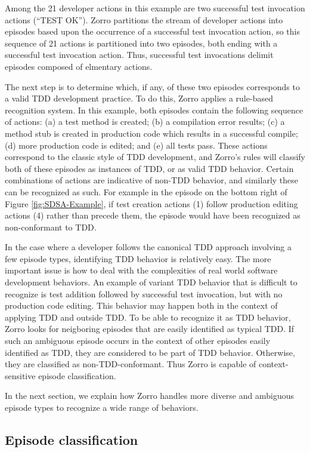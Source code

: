 \documentclass[smallextended]{svjour3}     %
\begin{document}
Among the 21 developer actions in this example are two successful test invocation actions
(``TEST OK'').  Zorro partitions the stream of developer actions into
episodes based upon the occurrence of a successful test invocation action,
so this sequence of 21 actions is partitioned into two episodes, both
ending with a successful test invocation action. Thus,  successful test invocations delimit episodes composed of elmentary actions. 

The next step is to determine which, if any, of these two episodes
corresponds to a valid TDD development practice.  To do this, Zorro applies
a rule-based recognition system.  In this example, both episodes contain
the following sequence of actions: (a) a test method is created; (b) a
compilation error results; (c) a method stub is created in production code
which results in a successful compile; (d) more production code is edited;
and (e) all tests pass.  These actions correspond to the classic style of
TDD development, and Zorro's rules will classify both of these episodes as
instances of TDD, or as valid TDD behavior. Certain combinations of actions
are indicative of non-TDD behavior, and similarly these can be recognized
as such. For example in the episode on the bottom right of Figure
\ref{fig:SDSA-Example}, if test creation actions (1) follow production
editing actions (4) rather than precede them, the episode would have been
recognized as non-conformant to TDD.

In the case where a developer follows the canonical TDD approach involving
a few episode types, identifying TDD behavior is relatively easy.  The more
important issue is how to deal with the complexities of real world software
development behaviors.  An example of variant TDD behavior that is
difficult to recognize is test addition followed by successful test
invocation, but with no production code editing. This behavior may happen
both in the context of applying TDD and outside TDD. To be able to
recognize it as TDD behavior, Zorro looks for neigboring episodes that are
easily identified as typical TDD. If such an ambiguous episode occurs in
the context of other episodes easily identified as TDD, they are considered
to be part of TDD behavior. Otherwise, they are classified as
non-TDD-conformant. Thus Zorro is capable of context-sensitive episode
classification.

In the next section, we explain how Zorro
handles more diverse and ambiguous episode types to recognize a wide range of behaviors. 

\subsection{Episode classification}
\end{document}
